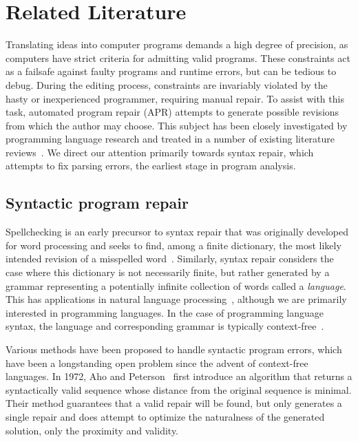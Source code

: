 \chapter{\rm\bfseries Related Literature}
\label{ch:litreview}

Translating ideas into computer programs demands a high degree of precision, as computers have strict criteria for admitting valid programs. These constraints act as a failsafe against faulty programs and runtime errors, but can be tedious to debug. During the editing process, constraints are invariably violated by the hasty or inexperienced programmer, requiring manual repair. To assist with this task, automated program repair (APR) attempts to generate possible revisions from which the author may choose. This subject has been closely investigated by programming language research and treated in a number of existing literature reviews~\cite{monperrus2018living, le2021automatic}. We direct our attention primarily towards syntax repair, which attempts to fix parsing errors, the earliest stage in program analysis.

\section{Syntactic program repair}

Spellchecking is an early precursor to syntax repair that was originally developed for word processing and seeks to find, among a finite dictionary, the most likely intended revision of a misspelled word~\cite{kernighan1990spelling}. Similarly, syntax repair considers the case where this dictionary is not necessarily finite, but rather generated by a grammar representing a potentially infinite collection of words called a \textit{language}. This has applications in natural language processing~\cite{bryant2023grammatical}, although we are primarily interested in programming languages. In the case of programming language syntax, the language and corresponding grammar is typically context-free~\cite{chomsky1959algebraic}.

Various methods have been proposed to handle syntactic program errors, which have been a longstanding open problem since the advent of context-free languages. In 1972, Aho and Peterson~\cite{aho1972minimum} first introduce an algorithm that returns a syntactically valid sequence whose distance from the original sequence is minimal. Their method guarantees that a valid repair will be found, but only generates a single repair and does attempt to optimize the naturalness of the generated solution, only the proximity and validity.

